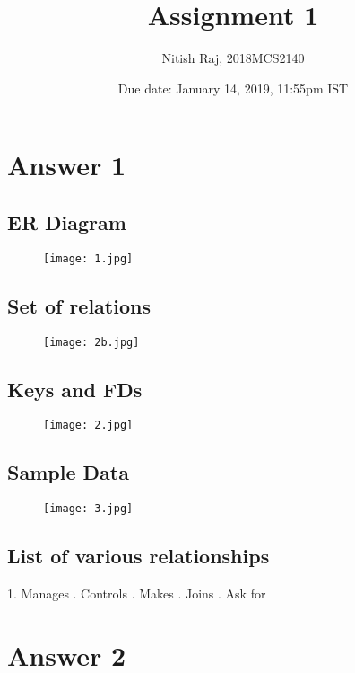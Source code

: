 \documentclass[10pt]{article}
\title{Assignment 1}
\author {Nitish Raj, 2018MCS2140}
\date{Due date: January 14, 2019, 11:55pm IST}
\begin{document}
\maketitle

\section{Answer 1}
\subsection{ER Diagram}

\begin{figure}[h]
\texttt{[image: 1.jpg]}
\end{figure}
\subsection{Set of relations}

\begin{figure}[h]
\texttt{[image: 2b.jpg]}
\end{figure}
\subsection{Keys and FDs}
\begin{figure}[h]
\texttt{[image: 2.jpg]}
\end{figure}
\subsection{Sample Data}
\begin{figure}[h]
\texttt{[image: 3.jpg]}
\end{figure}
\subsection{List of various relationships}
1. Manages . Controls . Makes . Joins . Ask for \newline

\section{Answer 2}
\end{document}
